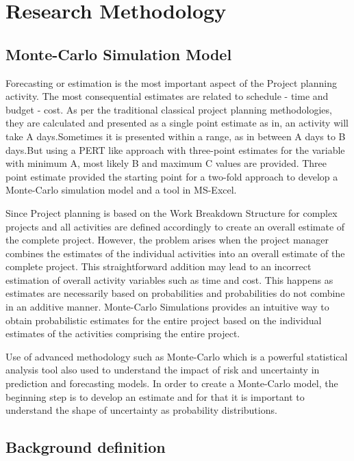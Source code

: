 \let\textcircled=\pgftextcircled
\chapter{Research Methodology}
\label{chap:RM}

\section{Monte-Carlo Simulation Model}

Forecasting or estimation is the most important aspect of the Project planning activity. The most consequential estimates are related to schedule - time and budget - cost. As per the traditional classical project planning methodologies, they are calculated and presented as a single point estimate as in, an activity will take A days.Sometimes it is presented within a range, as in between A days to B days.But using a PERT like approach with three-point estimates for the variable with minimum A, most likely B and maximum C values are provided. Three point estimate provided the starting point for a two-fold approach to develop a Monte-Carlo simulation model and a tool in MS-Excel.

Since Project planning is based on the Work Breakdown Structure for complex projects and all activities are defined accordingly to create an overall estimate of the complete project. However, the problem arises when the project manager combines the estimates of the individual activities into an overall estimate of the complete project. This straightforward addition may lead to an incorrect estimation of overall activity variables such as time and cost. This happens as estimates are necessarily based on probabilities and probabilities do not combine in an additive manner. Monte-Carlo Simulations provides an intuitive way to obtain probabilistic estimates for the entire project based on the individual estimates of the activities comprising the entire project. 

Use of advanced methodology such as Monte-Carlo which is a powerful statistical analysis tool also used to understand the impact of risk and uncertainty in prediction and forecasting models. In order to create a Monte-Carlo model, the beginning step is to develop an estimate and for that it is important to understand the shape of uncertainty as probability distributions.

\section{ Background definition}


